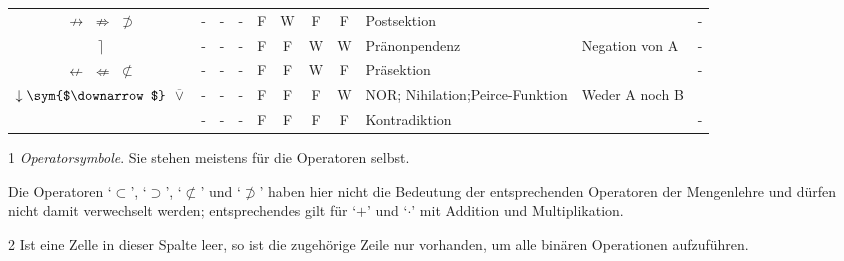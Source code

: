 \documentclass[english,ngerman,parskip=half,headsepline,footsepline,
	fleqn,notitlepage]{scrreprt}
\newcommand*{\texttrue}{W}%
\newcommand*{\textfalse}{F}%
\newcommand*{\lnimp}{\nrightarrow}%
\newcommand*{\lnimpA}{\nRightarrow}%
\newcommand*{\lnimpB}{\nsupset}%
\newcommand*{\lnleft}{\rceil}%
\newcommand*{\lnrep}{\nleftarrow}%
\newcommand*{\lnrepA}{\nLeftarrow}%
\newcommand*{\lnrepB}{\nsubset}%
\newcommand*{\lnor}{\downarrow}%
\newcommand*{\lnorA}{\operatorname{\overline\vee}}%
\newcommand*{\charqt}[1]{\enquote*{#1}}%
\newcommand*{\symqt}[1]{\charqt{#1}}%
\newcommand*{\Sym}[1]{#1\sym{$#1$}}%
\begin{document}
\begin{table}
\begin{threeparttable}
\begin{tabularx}{\linewidth-10.95pt}{c||c:cc:cccc|X:X|c|}
				\tableline%

				$\lnimp$ $\lnimpA$ $\lnimpB$
				& - & - & - &\textfalse&\texttrue&\textfalse&\textfalse
				& Postsektion
				&
				& - \\

				\tablegroup%

				$\lnleft$
				& - & - & - &\textfalse&\textfalse&\texttrue&\texttrue
				& Pränonpendenz
				& Negation von A
				& - \\

				\tableline%

				$\lnrep$ $\lnrepA$ $\lnrepB$
				& - & - & - &\textfalse&\textfalse&\texttrue&\textfalse
				& Präsektion
				&
				& - \\

				\tableline%

				$\Sym{\lnor}$ $\lnorA$
				& - & - & - &\textfalse&\textfalse&\textfalse&\texttrue
				& NOR; Nihilation;\newline Peirce-Funktion
				& Weder A noch B
				& \thepnor \\

				\tableline%

				~
				& - & - & - &\textfalse&\textfalse&\textfalse&\textfalse
				& Kontradiktion
				&
				& - \\

				\hline%
			\end{tabularx}
			\begin{tablenotes}
				\footnotesize

				\item[1] \emph{Operatorsymbole}. Sie stehen meistens für die Operatoren selbst.

				Die Operatoren \symqt{$\subset$}, \symqt{$\supset$},
				\symqt{$\nsubset$} und \symqt{$\nsupset$} haben hier nicht die
				Bedeutung der entsprechenden Operatoren der Mengenlehre
				und dürfen nicht damit verwechselt werden;
				entsprechendes gilt für \symqt{$+$} und \symqt{$\cdot$}
				mit Addition und Multiplikation.

				\item[2] Ist eine Zelle in dieser Spalte leer,
				so ist die zugehörige Zeile nur vorhanden,
				um alle binären Operationen aufzuführen.


\end{tablenotes}
\end{threeparttable}
\end{table}
\end{document}
